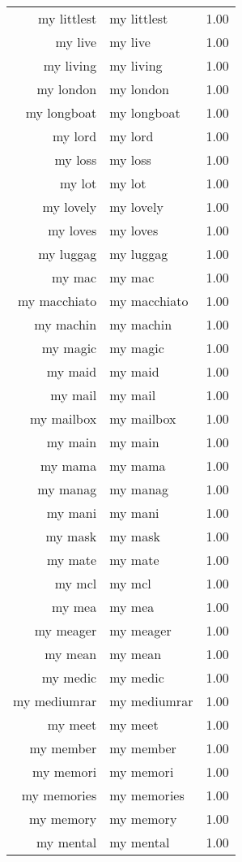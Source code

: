 \begin{table}[ht]
\begin{tabular}{rlr}
  my littlest & my littlest & 1.00 \\ 
  my live & my live & 1.00 \\ 
  my living & my living & 1.00 \\ 
  my london & my london & 1.00 \\ 
  my longboat & my longboat & 1.00 \\ 
  my lord & my lord & 1.00 \\ 
  my loss & my loss & 1.00 \\ 
  my lot & my lot & 1.00 \\ 
  my lovely & my lovely & 1.00 \\ 
  my loves & my loves & 1.00 \\ 
  my luggag & my luggag & 1.00 \\ 
  my mac & my mac & 1.00 \\ 
  my macchiato & my macchiato & 1.00 \\ 
  my machin & my machin & 1.00 \\ 
  my magic & my magic & 1.00 \\ 
  my maid & my maid & 1.00 \\ 
  my mail & my mail & 1.00 \\ 
  my mailbox & my mailbox & 1.00 \\ 
  my main & my main & 1.00 \\ 
  my mama & my mama & 1.00 \\ 
  my manag & my manag & 1.00 \\ 
  my mani & my mani & 1.00 \\ 
  my mask & my mask & 1.00 \\ 
  my mate & my mate & 1.00 \\ 
  my mcl & my mcl & 1.00 \\ 
  my mea & my mea & 1.00 \\ 
  my meager & my meager & 1.00 \\ 
  my mean & my mean & 1.00 \\ 
  my medic & my medic & 1.00 \\ 
  my mediumrar & my mediumrar & 1.00 \\ 
  my meet & my meet & 1.00 \\ 
  my member & my member & 1.00 \\ 
  my memori & my memori & 1.00 \\ 
  my memories & my memories & 1.00 \\ 
  my memory & my memory & 1.00 \\ 
  my mental & my mental & 1.00 \\ 

\end{tabular}
\end{table}
